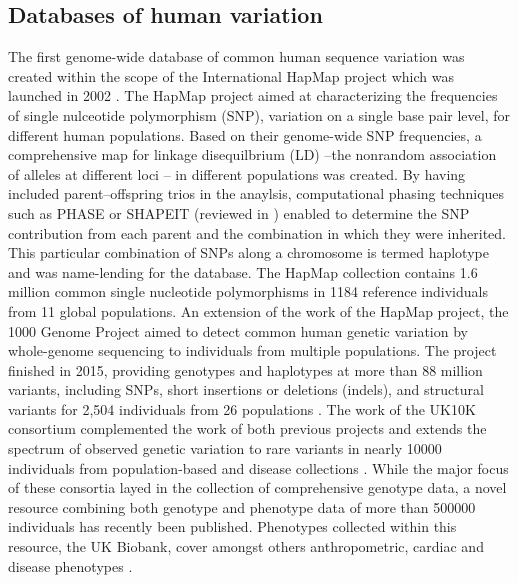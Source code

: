 \subsection{Databases of human variation}
\label{subsection:databases}
The first genome-wide database of common human sequence variation was created within the scope of the International HapMap project which was launched in 2002 \citep{HapMap2005,HapMap2007,HapMap2010}.
The HapMap project aimed at characterizing the frequencies of single nulceotide polymorphism (SNP), variation on a single base pair level, for different human populations. Based on their genome-wide SNP frequencies, a comprehensive map for linkage disequilbrium (LD) --the nonrandom association of alleles at different loci \citep{Lewontin1960}-- in different populations was created. By having included parent–offspring trios in the anaylsis, computational phasing techniques such as PHASE \citep{Stephens2001} or SHAPEIT \citep{Delaneau2012,Delaneau2013} (reviewed in \citep{Browning2011}) enabled to determine the SNP contribution from each parent and the combination in which they were inherited. This particular combination of SNPs along a chromosome is termed haplotype and was name-lending for the database. The HapMap collection contains 1.6 million common single nucleotide polymorphisms in \num{1184} reference individuals from 11 global populations. An extension of the work of the HapMap project, the 1000 Genome Project aimed to detect common human genetic variation by whole-genome sequencing to individuals from multiple populations. The project finished in 2015, providing genotypes and haplotypes at more than 88 million variants, including SNPs, short insertions or deletions (indels), and structural variants for 2,504 individuals from 26 populations \citep{1000Genomes2011,1000Genomes2012,1000Genomes2015}. The work of the UK10K consortium complemented the work of both previous projects and extends the spectrum of observed genetic variation to rare variants in nearly \num{10000} individuals from population-based and disease collections \citep{UK10KConsortium2015}. While the major focus of these consortia layed in the collection of comprehensive genotype data, a novel resource combining both genotype and phenotype data of more than \num{500000} individuals has recently been published. Phenotypes collected within this resource, the UK Biobank, cover amongst others anthropometric, cardiac and disease phenotypes \citep{Sudlow2015}.

